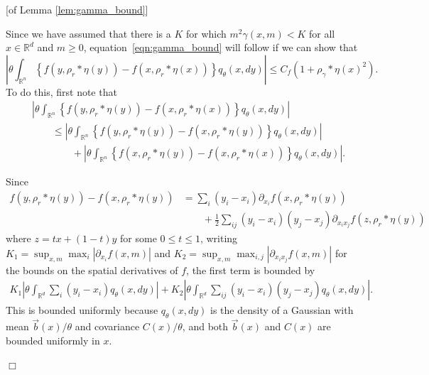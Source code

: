 \documentclass[12pt]{article}
\newenvironment {proof}{{\noindent\bf Proof }}{\hfill $\Box$ \medskip}
\newcommand{\IR}{\mathbb R}
\newcommand{\meanq}{\vec b}    %
\newcommand{\covq}{C}     %
\newcommand{\kernel}{\rho}  %
\newcommand{\smooth}[1]{\kernel_{#1} \! * \!}  %
\begin{document}
\begin{proof}[of Lemma \ref{lem:gamma_bound}]

    Since we have assumed that there is a $K$ for which $m^2 \gamma(x, m) < K$
    for all $x \in \IR^d$ and $m \ge 0$,
    equation~\eqref{eqn:gamma_bound} will follow if we can show that
    \begin{equation*}
        \left| \theta 
            \int_{\IR^n} 
                \left\{
                    f\left(y, \smooth{r}\eta(y)\right)
                    -
                    f\left(x, \smooth{r}\eta(x)\right)
                \right\}
            q_{\theta}(x,dy)
        \right|
        \leq
        C_f \left( 1 + \smooth{\gamma} \eta(x)^2 \right) .
    \end{equation*}
    To do this, first note that 
    \begin{align} \label{eqn:q_bound_split}
    &
        \left| \theta 
            \int_{\IR^n} 
                \left\{
                    f\left(y, \smooth{r}\eta(y)\right)
                    -
                    f\left(x, \smooth{r}\eta(x)\right)
                \right\}
            q_{\theta}(x,dy)
        \right|
    \\ &\qquad {} \leq
        \left| \theta 
            \int_{\IR^n} 
                \left\{
                    f\left(y, \smooth{r}\eta(y)\right)
                    -
                    f\left(x, \smooth{r}\eta(y)\right)
                \right\}
            q_{\theta}(x,dy)
        \right|
    \\ &\qquad \qquad {}  +
        \left| \theta 
            \int_{\IR^n} 
                \left\{
                    f\left(x, \smooth{r}\eta(y)\right)
                    -
                    f\left(x, \smooth{r}\eta(x)\right)
                \right\}
            q_{\theta}(x,dy) 
        \right| .
    \end{align}

    Since 
    \begin{align*}
        f\left(y, \smooth{r}\eta(y)\right) - f\left(x, \smooth{r}\eta(y)\right)
        &=
        \sum_i (y_i - x_i) \partial_{x_i} f \left(x, \smooth{r}\eta(y)\right) 
        \\ &\qquad {}
        +
        \frac{1}{2} \sum_{ij} (y_i - x_i)(y_j - x_j)
            \partial_{x_i x_j} f \left(z, \smooth{r}\eta(y)\right) 
    \end{align*}
    where $z = t x + (1-t) y$ for some $0 \le t \le 1$,
    writing
    $K_1 = \sup_{x,m} \max_i |\partial_{x_i} f(x, m)|$
    and 
    $K_2 = \sup_{x,m} \max_{i,j} |\partial_{x_i x_j} f(x, m)|$
    for the bounds on the spatial derivatives of $f$,
    the first term is bounded by
    \begin{align*}
        K_1 \left|
            \theta \int_{\IR^d} \sum_i (y_i - x_i) q_\theta(x, dy)
        \right|
        +
        K_2 \left|
            \theta \int_{\IR^d} \sum_{ij} (y_i - x_i) (y_j - x_j)  q_\theta(x, dy)
        \right| .
    \end{align*}
    This is bounded uniformly because
    $q_\theta(x, dy)$ is the density of a Gaussian with mean $\meanq(x)/\theta$
    and covariance $\covq(x)/\theta$, and both $\meanq(x)$ and $\covq(x)$
    are bounded uniformly in $x$.


\end{proof}
\end{document}

